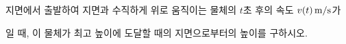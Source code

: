 지면에서 출발하여 지면과 수직하게 위로 움직이는 물체의 $t$초 후의 속도 $v(t)\mkern3mu \mathrm{m/s}$가\par\smallskip{}\par\smallskip\noindent 일 때, 이 물체가 최고 높이에 도달할 때의 지면으로부터의 높이를 구하시오.
